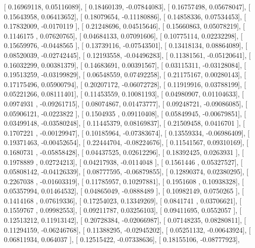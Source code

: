 \documentclass{article}
\begin{document}
       [ 0.16969118,  0.05116089],
       [ 0.18460139, -0.07844083],
       [ 0.16757498,  0.05678047],
       [ 0.15643958,  0.06413652],
       [ 0.18079654, -0.11180886],
       [ 0.14858336,  0.07534453],
       [ 0.17832009, -0.0170119 ],
       [ 0.21248696,  0.04515646],
       [ 0.15660863,  0.05078219],
       [ 0.1146175 ,  0.07620765],
       [ 0.04684133,  0.07091606],
       [ 0.10775114,  0.02232298],
       [ 0.15659976, -0.0448565 ],
       [ 0.13739116, -0.07543501],
       [ 0.13418134,  0.08864089],
       [ 0.08520039, -0.02742445],
       [ 0.12193558, -0.04496283],
       [ 0.11381561, -0.05120641],
       [ 0.16032299,  0.00381379],
       [ 0.14683691,  0.00391567],
       [ 0.03115311, -0.03128084],
       [ 0.19513259, -0.03199829],
       [ 0.06548559,  0.07492258],
       [ 0.21175167,  0.00280143],
       [ 0.17175496,  0.05900794],
       [ 0.20207172, -0.06072728],
       [ 0.11919916,  0.03788199],
       [ 0.05221266,  0.08111401],
       [ 0.11453559,  0.10081193],
       [ 0.04980907,  0.01104633],
       [ 0.0974931 , -0.09261715],
       [ 0.08074867,  0.01473777],
       [ 0.09248721, -0.09086085],
       [ 0.05906121, -0.0223822 ],
       [ 0.1504935 ,  0.09110408],
       [ 0.05849945, -0.00679851],
       [ 0.03499148, -0.03580248],
       [ 0.11445379,  0.08169837],
       [ 0.21509458,  0.0416701 ],
       [ 0.1707221 , -0.00129947],
       [ 0.10185964, -0.07383674],
       [ 0.13559334, -0.06986409],
       [ 0.19371463, -0.00452654],
       [ 0.22444704, -0.08224676],
       [ 0.11541567,  0.09310169],
       [ 0.1680731 , -0.05858428],
       [ 0.04437525,  0.02612296],
       [ 0.18392425,  0.0263931 ],
       [ 0.1978889 ,  0.02724213],
       [ 0.04217938, -0.0114048 ],
       [ 0.1561446 ,  0.05327527],
       [ 0.05808142, -0.04126339],
       [ 0.08777595, -0.06879855],
       [ 0.12890374,  0.02380295],
       [ 0.2267038 , -0.01603319],
       [ 0.11785957,  0.10297881],
       [ 0.1951608 ,  0.10938328],
       [ 0.05357994,  0.01464532],
       [ 0.04865049, -0.0888489 ],
       [ 0.10982149,  0.0750265 ],
       [ 0.1414168 ,  0.07619336],
       [ 0.17254023,  0.13349269],
       [ 0.0841741 ,  0.03706621],
       [ 0.1559767 ,  0.09982553],
       [ 0.09211787,  0.03256103],
       [ 0.09411695,  0.0552057 ],
       [ 0.12513212,  0.11913142],
       [ 0.20728384, -0.02066987],
       [ 0.07148235,  0.08280811],
       [ 0.11294159, -0.06246768],
       [ 0.11388295, -0.02945202],
       [ 0.05251132, -0.00643924],
       [ 0.06811934,  0.064037  ],
       [ 0.12515422, -0.07338636],
       [ 0.18155106, -0.08777923],
\end{document}
